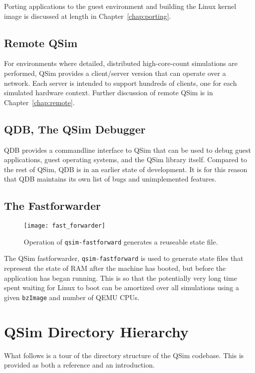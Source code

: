 \documentclass[letterpaper, 10pt]{book}
\begin{document}
Porting applications to the guest environment and building the Linux kernel
image is discussed at length in Chapter~\ref{chap:porting}.

\subsection{Remote QSim}

For environments where detailed, distributed high-core-count simulations are
performed, QSim provides a client/server version that can operate over a
network. Each server is intended to support hundreds of clients, one for each
simulated hardware context. Further discussion of remote QSim is in
Chapter~\ref{chap:remote}.


\subsection{QDB, The QSim Debugger}

QDB provides a commandline interface to QSim that can be used to debug guest
applications, guest operating systems, and the QSim library itself. Compared to
the rest of QSim, QDB is in an earlier state of development. It is for this
reason that QDB maintains its own list of bugs and unimplemented features.

\subsection{The Fastforwarder}\label{sec:fastforwarder}
\begin{figure}
\begin{centering}
\texttt{[image: fast\_forwarder]}
\caption{Operation of \texttt{qsim-fastforward} generates a reuseable state
         file.}
\label{fig:fastforwarder}
\end{centering}
\end{figure}

The QSim fastforwarder, \texttt{qsim-fastforward} is used to generate state
files that represent the state of RAM after the machine has booted, but before
the application has began running. This is so that the potentially very
long time spent waiting for Linux to boot can be amortized over all simulations
using a given \texttt{bzImage} and number of QEMU CPUs.

\section{QSim Directory Hierarchy}
What follows is a tour of the directory structure of the QSim codebase. This is
provided as both a reference and an introduction.
\end{document}
